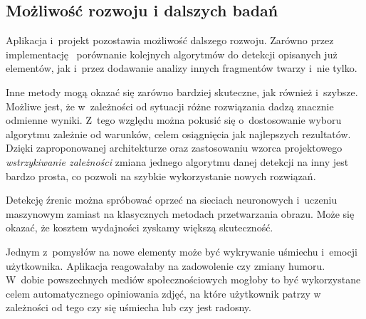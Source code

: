 \subsection{Możliwość rozwoju i dalszych badań}

Aplikacja i~projekt pozostawia możliwość dalszego rozwoju. Zarówno przez implementację ~porównanie kolejnych algorytmów do detekcji opisanych już elementów, jak i~przez dodawanie analizy innych fragmentów twarzy i~nie tylko.

\par

Inne metody mogą okazać się zarówno bardziej skuteczne, jak również i~szybsze. Możliwe jest, że w~zależności od sytuacji różne rozwiązania dadzą znacznie odmienne wyniki. Z~tego względu można pokusić się o~dostosowanie wyboru algorytmu zależnie od warunków, celem osiągnięcia jak najlepszych rezultatów. Dzięki zaproponowanej architekturze oraz zastosowaniu wzorca projektowego \textit{wstrzykiwanie zależności} zmiana jednego algorytmu danej detekcji na inny jest bardzo prosta, co pozwoli na szybkie wykorzystanie nowych rozwiązań.

\par

Detekcję źrenic można spróbować oprzeć na sieciach neuronowych i~uczeniu maszynowym zamiast na klasycznych metodach przetwarzania obrazu. Może się okazać, że kosztem wydajności zyskamy większą skuteczność.

\par

Jednym z~pomysłów na nowe elementy może być wykrywanie uśmiechu i~emocji użytkownika. Aplikacja reagowałaby na zadowolenie czy zmiany humoru. W~dobie powszechnych mediów społecznościowych mogłoby to być wykorzystane celem automatycznego opiniowania zdjęć, na które użytkownik patrzy w zależności od tego czy się uśmiecha lub czy jest radosny.
